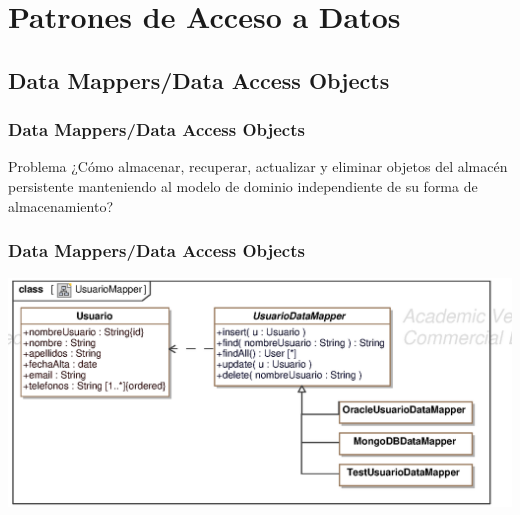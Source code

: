 \documentclass[a4paper,slidestop,xcolor=pst,blue]{beamer}
\begin{document}

\section{Patrones de Acceso a Datos}

\subsection{Data Mappers/Data Access Objects}

\begin{frame}[c]
    \frametitle{Data Mappers/Data Access Objects}
    \begin{block}{Problema}
        ¿Cómo almacenar, recuperar, actualizar y eliminar objetos del almacén persistente manteniendo al modelo de dominio independiente de su forma de almacenamiento?
    \end{block}
\end{frame}

\begin{frame}[c]
    \frametitle{Data Mappers/Data Access Objects}
    \begin{center}
        \includegraphics[width=0.8\linewidth]{images/behaviour/dataMapper.eps}
    \end{center}
\end{frame}
\end{document}
